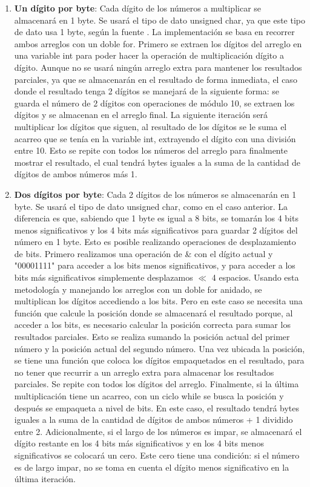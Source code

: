\documentclass[10pt]{article}
\begin{document}
\begin{enumerate}
    \item \textbf{Un dígito por byte}: Cada dígito de los números a multiplicar se almacenará en 1 byte. Se usará el tipo de dato unsigned char, ya que este tipo de dato usa 1 byte, según la fuente \cite{X4}. La implementación se basa en recorrer ambos arreglos con un doble for. Primero se extraen los dígitos del arreglo en una variable int para poder hacer la operación de multiplicación dígito a dígito. Aunque no se usará ningún arreglo extra para mantener los resultados parciales, ya que se almacenarán en el resultado de forma inmediata, el caso donde el resultado tenga 2 dígitos se manejará de la siguiente forma: se guarda el número de 2 dígitos con operaciones de módulo 10, se extraen los dígitos y se almacenan en el arreglo final. La siguiente iteración será multiplicar los dígitos que siguen, al resultado de los dígitos se le suma el acarreo que se tenía en la variable int, extrayendo el dígito con una división entre 10. Esto se repite con todos los números del arreglo para finalmente mostrar el resultado, el cual tendrá bytes iguales a la suma de la cantidad de dígitos de ambos números más 1.
    
    \item \textbf{Dos dígitos por byte}: Cada 2 dígitos de los números se almacenarán en 1 byte. Se usará el tipo de dato unsigned char, como en el caso anterior. La diferencia es que, sabiendo que 1 byte es igual a 8 bits, se tomarán los 4 bits menos significativos y los 4 bits más significativos para guardar 2 dígitos del número en 1 byte. Esto es posible realizando operaciones de desplazamiento de bits. Primero realizamos una operación de \& con el dígito actual y "00001111" para acceder a los bits menos significativos, y para acceder a los bits más significativos simplemente desplazamos $\ll$ 4 espacios. Usando esta metodología y manejando los arreglos con un doble for anidado, se multiplican los dígitos accediendo a los bits. Pero en este caso se necesita una función que calcule la posición donde se almacenará el resultado porque, al acceder a los bits, es necesario calcular la posición correcta para sumar los resultados parciales. Esto se realiza sumando la posición actual del primer número y la posición actual del segundo número. Una vez ubicada la posición, se tiene una función que coloca los dígitos empaquetados en el resultado, para no tener que recurrir a un arreglo extra para almacenar los resultados parciales. Se repite con todos los dígitos del arreglo. Finalmente, si la última multiplicación tiene un acarreo, con un ciclo while se busca la posición y después se empaqueta a nivel de bits. En este caso, el resultado tendrá bytes iguales a la suma de la cantidad de dígitos de ambos números + 1 dividido entre 2.
    Adicionalmente, si el largo de los números es impar, se almacenará el dígito restante en los 4 bits más significativos y en los 4 bits menos significativos se colocará un cero. Este cero tiene una condición: si el número es de largo impar, no se toma en cuenta el dígito menos significativo en la última iteración.
    

\end{enumerate}
\end{document}
